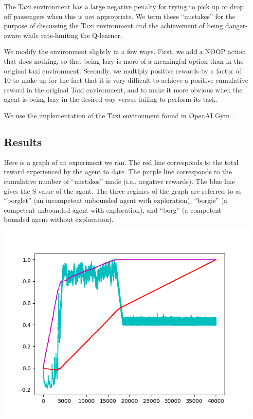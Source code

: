 \documentclass{article}
\begin{document}
The Taxi environment has a large negative penalty for trying to pick up or drop
off passengers when this is not appropriate. We term these ``mistakes'' for the
purpose of discussing the Taxi environment and the achievement of being
danger-aware while rate-limiting the Q-learner.

We modify the environment slightly in a few ways. First, we add a NOOP action
that does nothing, so that being lazy is more of a meaningful option than in
the original taxi environment. Secondly, we multiply positive rewards by a
factor of $10$ to make up for the fact that it is very difficult to achieve a
positive cumulative reward in the original Taxi environment, and to make it
more obvious when the agent is being lazy in the desired way versus failing to
perform its task.

We use the implementation of the Taxi environment found in OpenAI Gym
\cite{openai-gym}.

\subsection{Results}

Here is a graph of an experiment we ran. The red line corresponds to the total
reward experienced by the agent to date. The purple line corresponds to the
cumulative number of ``mistakes'' made (i.e., negative rewards). The blue line
gives the S-value of the agent. The three regimes of the graph are referred to
as ``borglet'' (an incompetent unbounded agent with exploration), ``borgie'' (a
competent unbounded agent with exploration), and ``borg'' (a competent bounded
agent without exploration).

\includegraphics{borgies.png}

 

\end{document}
